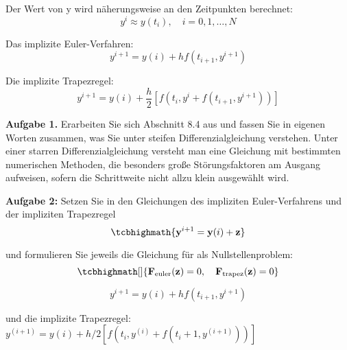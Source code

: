 Der Wert von y wird näherungsweise an den Zeitpunkten berechnet:
\begin{equation}
	 y^i \approx y(t_i),\quad i = 0,1,\dots,N 
\end{equation}


Das implizite Euler-Verfahren:
\begin{equation}
	 y^{i+1} = y(i) + hf(t_{i+1},y^{i+1}) 
\end{equation}


Die implizite Trapezregel:
\begin{equation}
	y^{i+1} = y(i) + \frac{h}{2}\left[f\left(t_i, y^i + f(t_{i+1},y^{i+1})\right)\right] 
\end{equation}



\begin{mybox}
\textbf{Aufgabe 1.}	
	Erarbeiten Sie sich Abschnitt 8.4 aus \cite{Atkinson.2004} und fassen Sie in eigenen Worten zusammen, was Sie unter steifen Differenzialgleichung verstehen.
	Unter einer starren Differenzialgleichung versteht man eine Gleichung mit bestimmten numerischen Methoden, die besonders große Störungsfaktoren am Ausgang aufweisen, sofern die Schrittweite nicht allzu klein ausgewählt wird.
\end{mybox}



\begin{mybox}
	\textbf{Aufgabe 2:}
	Setzen Sie in den Gleichungen des impliziten Euler-Verfahrens und der impliziten Trapezregel
	\begin{equation*}
	\tcbhighmath{\mathbf{y}^{i+1} = \mathbf{y}(i) + \mathbf{z}}  
	\end{equation*}
	
	und formulieren Sie jeweils die Gleichung für  als Nullstellenproblem:
	\begin{equation*}
		\tcbhighmath[]{\mathbf{F}_{\mathrm{euler}}(\mathbf{z}) = 0,\quad \mathbf{F}_{\mathrm{trapez}}(\mathbf{z}) = 0}   
	\end{equation*}
	
\end{mybox}


\begin{equation}
 	y^{i+1} = y(i) + hf(t_{i+1},y^{i+1}) 
\end{equation}


und die implizite Trapezregel:
$ y^(i+1) = y(i) + h/2[f(t_i, y^(i) + f(t_i+1,y^(i+1)))] $

